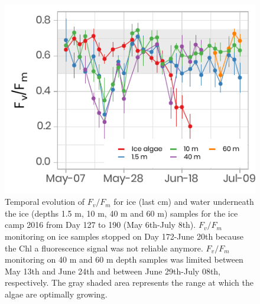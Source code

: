 \documentclass[12pt,a4paper]{scrartcl}
\begin{document}
\clearpage
\newpage

\begin{figure}[h]
	\centering
	\includegraphics[scale = 2]{../../../graphs/fig9.pdf}
	\caption{Temporal evolution of $F_v/F_m$ for ice (last cm) and water underneath the ice (depths 1.5 m, 10 m, 40 m and 60 m) samples for the ice camp 2016 from Day 127 to 190 (May 6th-July 8th). $F_v/F_m$ monitoring on ice samples stopped on Day 172-June 20th because the Chl a fluorescence signal was not reliable anymore. $F_v/F_m$ monitoring on 40 m and 60 m depth samples was limited between May 13th and June 24th and between June 29th-July 08th, respectively. The gray shaded area represents the range at which the algae are optimally growing.}
\end{figure}

\clearpage
\newpage
\end{document}
